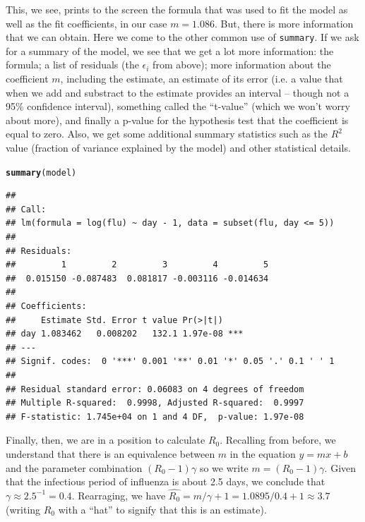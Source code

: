 \documentclass{article}\usepackage[]{graphicx}\usepackage[]{color}
\makeatletter
\newcommand{\hlstd}[1]{\textcolor[rgb]{0.345,0.345,0.345}{#1}}%
\newcommand{\hlkwd}[1]{\textcolor[rgb]{0.737,0.353,0.396}{\textbf{#1}}}%
\newenvironment{kframe}{%
 \def\at@end@of@kframe{}%
 \ifinner\ifhmode%
  \def\at@end@of@kframe{\end{minipage}}%
  \begin{minipage}{\columnwidth}%
 \fi\fi%
 \def\FrameCommand##1{\hskip\@totalleftmargin \hskip-\fboxsep
 \colorbox{shadecolor}{##1}\hskip-\fboxsep
     \hskip-\linewidth \hskip-\@totalleftmargin \hskip\columnwidth}%
 \MakeFramed {\advance\hsize-\width
   \@totalleftmargin\z@ \linewidth\hsize
   \@setminipage}}%
 {\par\unskip\endMakeFramed%
 \at@end@of@kframe}
\newenvironment{knitrout}{}{} %
\newcommand{\code}[1]{\texttt{#1}}
\theoremstyle{exercise}
\makeatother
\begin{document}
This, we see, prints to the screen the formula that was used to fit the model as well as the fit coefficients, in our case $m=1.086$. But, there is more information that we can obtain. Here we come to the other common use of \code{summary}. If we ask for a summary of the model, we see that we get a lot more information: the formula; a list of residuals (the $\epsilon_i$ from above); more information about the coefficient $m$, including the estimate, an estimate of its error (i.e. a value that when we add and substract to the estimate provides an interval -- though not a 95\% confidence interval), something called the ``t-value'' (which we won't worry about more), and finally a p-value for the hypothesis test that the coefficient is equal to zero. Also, we get some additional summary statistics such as the $R^2$ value (fraction of variance explained by the model) and other statistical details.

\begin{knitrout}
\color{fgcolor}\begin{kframe}
\begin{alltt}
\hlkwd{summary}\hlstd{(model)}
\end{alltt}
\begin{verbatim}
## 
## Call:
## lm(formula = log(flu) ~ day - 1, data = subset(flu, day <= 5))
## 
## Residuals:
##         1         2         3         4         5 
##  0.015150 -0.087483  0.081817 -0.003116 -0.014634 
## 
## Coefficients:
##     Estimate Std. Error t value Pr(>|t|)    
## day 1.083462   0.008202   132.1 1.97e-08 ***
## ---
## Signif. codes:  0 '***' 0.001 '**' 0.01 '*' 0.05 '.' 0.1 ' ' 1
## 
## Residual standard error: 0.06083 on 4 degrees of freedom
## Multiple R-squared:  0.9998,	Adjusted R-squared:  0.9997 
## F-statistic: 1.745e+04 on 1 and 4 DF,  p-value: 1.97e-08
\end{verbatim}
\end{kframe}
\end{knitrout}

Finally, then, we are in a position to calculate $R_0$. Recalling from before, we understand that there is an equivalence between $m$ in the equation $y=mx+b$ and the parameter combination $(R_0-1) \gamma$ so we write $m=(R_0-1) \gamma$. Given that the infectious period of influenza is about 2.5 days, we conclude that $\gamma \approx 2.5^{-1} = 0.4$. Rearraging, we have $\hat{R_0} = m/ \gamma +1 = 1.0895 / 0.4 + 1 \approx 3.7$ (writing $R_0$ with a ``hat'' to signify that this is an estimate).
\end{document}
